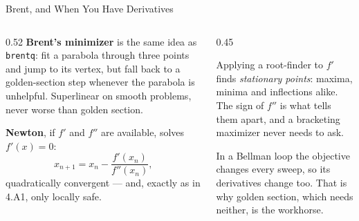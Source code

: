 \begin{frame}{Brent, and When You Have Derivatives}
\begin{columns}[T]
\begin{column}{0.52\textwidth}
\small
\textbf{Brent's minimizer} is the same idea as \texttt{brentq}: fit a parabola through three points and jump to its vertex, but fall back to a golden-section step whenever the parabola is unhelpful. Superlinear on smooth problems, never worse than golden section.
\medskip

\textbf{Newton}, if $f'$ and $f''$ are available, solves $f'(x)=0$:
\[
  x_{n+1}=x_n-\frac{f'(x_n)}{f''(x_n)} ,
\]
quadratically convergent --- and, exactly as in 4.A1, only locally safe.
\end{column}
\begin{column}{0.45\textwidth}
\begin{cautionbox}[title=\textbf{Maximizing is not root-finding}]\footnotesize
Applying a root-finder to $f'$ finds \emph{stationary points}: maxima, minima and inflections alike. The sign of $f''$ is what tells them apart, and a bracketing maximizer never needs to ask.
\end{cautionbox}
\medskip
\begin{examplebox}\footnotesize
In a Bellman loop the objective changes every sweep, so its derivatives change too. That is why golden section, which needs neither, is the workhorse.
\end{examplebox}
\end{column}
\end{columns}
\end{frame}


